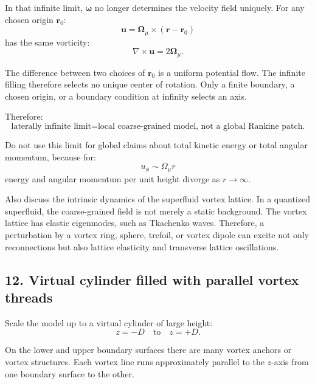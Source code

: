 \documentclass[11pt]{article}
\begin{document}
            In that infinite limit, \(\boldsymbol{\omega}\) no longer determines the velocity field uniquely. For any chosen origin \(\mathbf{r}_0\):
            \[
                \mathbf{u}
                =
                \boldsymbol{\Omega}_{\mu}
                \times
                (\mathbf{r}-\mathbf{r}_0)
            \]
            has the same vorticity:
            \[
                \nabla\times\mathbf{u}
                =
                2\boldsymbol{\Omega}_{\mu}.
            \]
            
            The difference between two choices of \(\mathbf{r}_0\) is a uniform potential flow. The infinite filling therefore selects no unique center of rotation. Only a finite boundary, a chosen origin, or a boundary condition at infinity selects an axis.
            
            Therefore:
            \[
                \boxed{
                    \text{laterally infinite limit}
                    =
                    \text{local coarse-grained model, not a global Rankine patch.}
                }
            \]
            
            Do not use this limit for global claims about total kinetic energy or total angular momentum, because for:
            \[
                u_{\phi}\sim\Omega_{\mu}r
            \]
            energy and angular momentum per unit height diverge as \(r\rightarrow\infty\).
            
            Also discuss the intrinsic dynamics of the superfluid vortex lattice. In a quantized superfluid, the coarse-grained field is not merely a static background. The vortex lattice has elastic eigenmodes, such as Tkachenko waves. Therefore, a perturbation by a vortex ring, sphere, trefoil, or vortex dipole can excite not only reconnections but also lattice elasticity and transverse lattice oscillations.
        
        \subsection{12. Virtual cylinder filled with parallel vortex threads}
            
            Scale the model up to a virtual cylinder of large height:
            \[
                z=-D
                \quad\text{to}\quad
                z=+D.
            \]
            
            On the lower and upper boundary surfaces there are many vortex anchors or vortex structures. Each vortex line runs approximately parallel to the \(z\)-axis from one boundary surface to the other.
            
\end{document}
